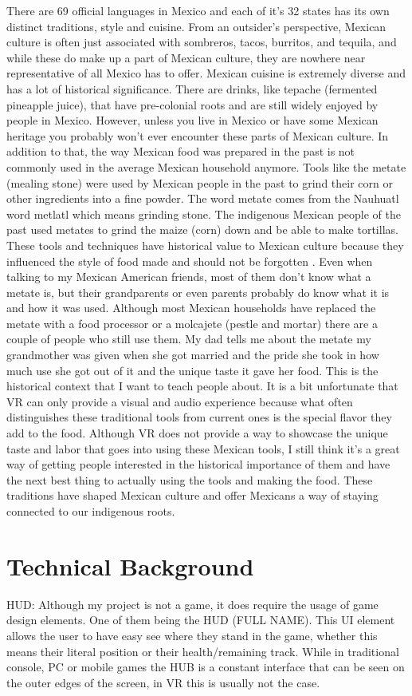\documentclass[11pt,twocolumn]{article}
\begin{document}
There are 69 official languages in Mexico and each of it’s 32 states has its own distinct traditions, style and cuisine. From an outsider’s perspective, Mexican culture is often just associated with sombreros, tacos, burritos, and tequila, and while these do make up a part of Mexican culture, they are nowhere near representative of all Mexico has to offer. Mexican cuisine is extremely diverse and has a lot of historical significance. There are drinks, like tepache (fermented pineapple juice), that have pre-colonial roots and are still widely enjoyed by people in Mexico. However, unless you live in Mexico or have some Mexican heritage you probably won’t ever encounter these parts of Mexican culture. In addition to that, the way Mexican food was prepared in the past is not commonly used in the average Mexican household anymore. Tools like the metate (mealing stone) were used by Mexican people in the past to grind their corn or other ingredients into a fine powder. The word metate comes from the Nauhuatl word metlatl which means grinding stone. The indigenous Mexican people of the past used metates to grind the maize (corn) down and be able to make tortillas. These tools and techniques have historical value to Mexican culture because they influenced the style of food made and should not be forgotten . Even when talking to my Mexican American friends, most of them don’t know what a metate is, but their grandparents or even parents probably do know what it is and how it was used. Although most Mexican households have replaced the metate with a food processor or a molcajete (pestle and mortar) there are a couple of people who still use them. My dad tells me about the metate my grandmother was given when she got married and the pride she took in how much use she got out of it and the unique taste it gave her food. This is the historical context that I want to teach people about. It is a bit unfortunate that VR can only provide a visual and audio experience because what often distinguishes these traditional tools from current ones is the special flavor they add to the food. Although VR does not provide a way to showcase the unique taste and labor that goes into using these Mexican tools, I still think it’s a great way of getting people interested in the historical importance of them and have the next best thing to actually using the tools and making the food. These traditions have shaped Mexican culture and offer Mexicans a way of staying connected to our indigenous roots. 
 

\section{Technical Background}
HUD: Although my project is not a game, it does require the usage of game design elements. One of them being the HUD (FULL NAME). This UI element allows the user to have easy see where they stand in the game, whether this means their literal position or their health/remaining track. While in traditional console, PC or mobile games the HUB is a constant interface that can be seen on the outer edges of the screen, in VR this is usually not the case. 
\end{document}
